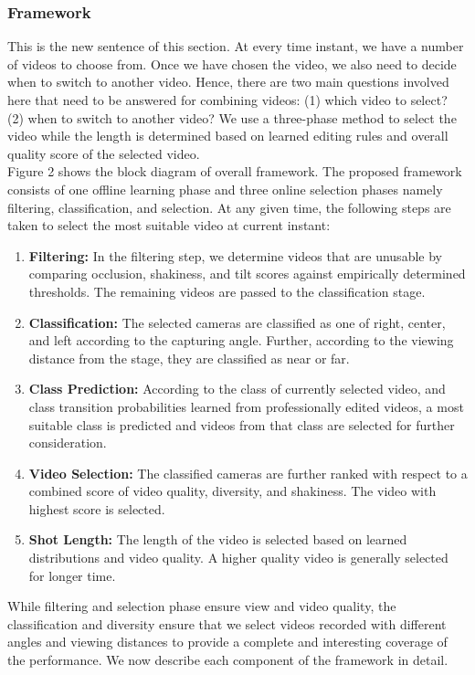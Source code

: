 \documentclass{sig-alternate}
\begin{document}
{{{\subsubsection{Framework}
This is the new sentence of this section.
At every time instant, we have a number of videos to choose
from. Once we have chosen the video, we also need to decide when
to switch to another video. Hence, there are two main questions
involved here that need to be answered for combining videos: (1)
which video to select? (2) when to switch to another video? We
use a three-phase method to select the video while the length is
determined based on learned editing rules and overall quality score
of the selected video.\\
Figure 2 shows the block diagram of overall framework. The
proposed framework consists of one offline learning phase and three 
online selection phases namely filtering, classification, and selection.
At any given time, the following steps are taken to select the
most suitable video at current instant:

\begin{enumerate}
    \item \textbf{Filtering: }In the filtering step, we determine videos that are
unusable by comparing occlusion, shakiness, and tilt scores
against empirically determined thresholds. The remaining
videos are passed to the classification stage.
   \item \textbf{Classification: }The selected cameras are classified as one
of right, center, and left according to the capturing angle.
Further, according to the viewing distance from the stage,
they are classified as near or far.
   \item \textbf{Class Prediction: }According to the class of currently selected
video, and class transition probabilities learned from
professionally edited videos, a most suitable class is predicted
and videos from that class are selected for further consideration.
   \item \textbf{Video Selection: }The classified cameras are further ranked
with respect to a combined score of video quality, diversity,
and shakiness. The video with highest score is selected.
   \item \textbf{Shot Length: }The length of the video is selected based on
learned distributions and video quality. A higher quality video
is generally selected for longer time.
\end{enumerate}
While filtering and selection phase ensure view and video quality,
the classification and diversity ensure that we select videos
recorded with different angles and viewing distances to provide a
complete and interesting coverage of the performance. We now
describe each component of the framework in detail.

}}}
\end{document}
